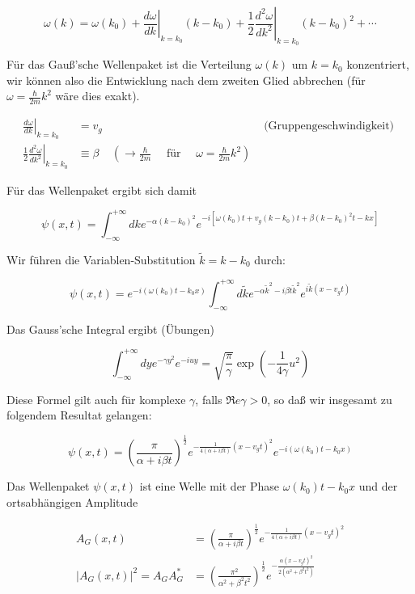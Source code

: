 \documentclass[10pt, letterpaper]{article}
\begin{document}
$$
\omega(k)=\omega\left(k_{0}\right)+\left.\frac{d \omega}{d k}\right|_{k=k_{0}}\left(k-k_{0}\right)+\left.\frac{1}{2} \frac{d^{2} \omega}{d k^{2}}\right|_{k=k_{0}}\left(k-k_{0}\right)^{2}+\cdots
$$

Für das Gauß'sche Wellenpaket ist die Verteilung $\omega(k)$ um $k=k_{0}$ konzentriert, wir können also die Entwicklung nach dem zweiten Glied abbrechen (für $\omega=\frac{\hbar}{2 m} k^{2}$ wäre dies exakt).

$$
\begin{array}{rlrl}
\left.\frac{d \omega}{d k}\right|_{k=k_{0}} & =v_{g} & & \text { (Gruppengeschwindigkeit) } \\
\left.\frac{1}{2} \frac{d^{2} \omega}{d k^{2}}\right|_{k=k_{0}} & \equiv \beta & \left(\rightarrow \frac{\hbar}{2 m} \quad \text { für } \quad \omega=\frac{\hbar}{2 m} k^{2}\right)
\end{array}
$$

Für das Wellenpaket ergibt sich damit

$$
\psi(x, t)=\int_{-\infty}^{+\infty} d k e^{-\alpha\left(k-k_{0}\right)^{2}} e^{-i\left[\omega\left(k_{0}\right) t+v_{g}\left(k-k_{0}\right) t+\beta\left(k-k_{0}\right)^{2} t-k x\right]}
$$

Wir führen die Variablen-Substitution $\tilde{k}=k-k_{0}$ durch:

$$
\psi(x, t)=e^{-i\left(\omega\left(k_{0}\right) t-k_{0} x\right)} \int_{-\infty}^{+\infty} d \tilde{k} e^{-\alpha \tilde{k}^{2}-i \beta t \tilde{k}^{2}} e^{i \tilde{k}\left(x-v_{g} t\right)}
$$

Das Gauss'sche Integral ergibt (Übungen)

$$
\int_{-\infty}^{+\infty} d y e^{-\gamma y^{2}} e^{-i u y}=\sqrt{\frac{\pi}{\gamma}} \exp \left(-\frac{1}{4 \gamma} u^{2}\right)
$$

Diese Formel gilt auch für komplexe $\gamma$, falls $\Re e \gamma>0$, so daß wir insgesamt zu folgendem Resultat gelangen:

$$
\psi(x, t)=\left(\frac{\pi}{\alpha+i \beta t}\right)^{\frac{1}{2}} e^{-\frac{1}{4(\alpha+i \beta t)}\left(x-v_{g} t\right)^{2}} e^{-i\left(\omega\left(k_{0}\right) t-k_{0} x\right)}
$$

Das Wellenpaket $\psi(x, t)$ ist eine Welle mit der Phase $\omega\left(k_{0}\right) t-k_{0} x$ und der ortsabhängigen Amplitude

$$
\begin{aligned}
A_{G}(x, t) & =\left(\frac{\pi}{\alpha+i \beta t}\right)^{\frac{1}{2}} e^{-\frac{1}{4(\alpha+i \beta t)}\left(x-v_{g} t\right)^{2}} \\
\left|A_{G}(x, t)\right|^{2}=A_{G} A_{G}^{*} & =\left(\frac{\pi^{2}}{\alpha^{2}+\beta^{2} t^{2}}\right)^{\frac{1}{2}} e^{-\frac{\alpha\left(x-v_{g} t\right)^{2}}{2\left(\alpha^{2}+\beta^{2} t^{2}\right)}}
\end{aligned}
$$
\end{document}
